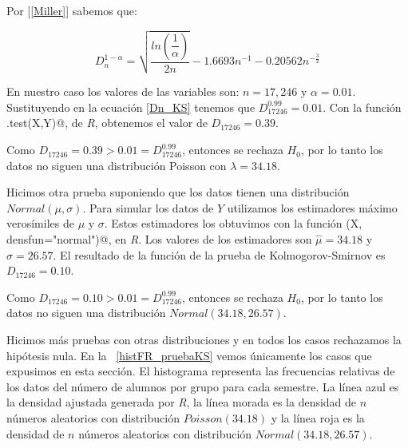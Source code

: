 Por [\ref{Miller}] sabemos que:
  
  \begin{equation}\label{Dn_KS}
D_{n}^{1-\alpha} = \sqrt{\dfrac{ln \left(\dfrac{1}{\alpha}\right)}{2n}} - 1.6693 n^{-1} - 0.20562 n^{-\frac{3}{2}}
\end{equation}

En nuestro caso los valores de las variables son: $n = 17,246$ y $\alpha = 0.01$. Sustituyendo en la ecuación \ref{Dn_KS} tenemos que $D_{17246}^{0.99} = 0.01$. Con la función \verb@ks.test(X,Y)@, de \textit{R}, obtenemos el valor de $D_{17246} = 0.39$.

Como $D_{17246} = 0.39 > 0.01 = D_{17246}^{0.99}$, entonces se rechaza $H_{0}$, por lo tanto los datos no siguen una distribución Poisson con $\lambda = 34.18$.


Hicimos otra prueba suponiendo que los datos tienen una distribución $Normal(\mu,\sigma)$. Para simular los datos de $Y$ utilizamos los estimadores máximo verosímiles de $\mu$ y $\sigma$. Estos estimadores los obtuvimos con la función \verb@fitdistr(X, densfun="normal")@, en \textit{R}. Los valores de los estimadores son $\hat{\mu} = 34.18$ y $\hat{\sigma} = 26.57$. El resultado de la función de la prueba de Kolmogorov-Smirnov es $D_{17246} = 0.10$.

Como $D_{17246} = 0.10 > 0.01 = D_{17246}^{0.99}$, entonces se rechaza $H_{0}$, por lo tanto los datos no siguen una distribución $Normal(34.18,26.57)$.

Hicimos más pruebas con otras distribuciones y en todos los casos rechazamos la hipótesis nula. En la \figurename{~\ref{histFR_pruebaKS}} vemos únicamente los casos que expusimos en esta sección. El histograma representa las frecuencias relativas de los datos del número de alumnos por grupo para cada semestre. La línea azul es la densidad ajustada generada por \textit{R}, la línea morada es la densidad de $n$ números aleatorios con distribución  $Poisson(34.18)$ y la línea roja es la densidad de $n$ números aleatorios con distribución  $Normal(34.18,26.57)$.


